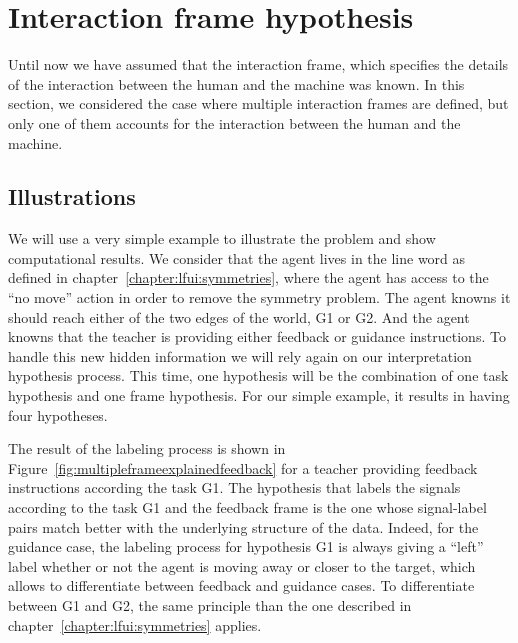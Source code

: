 
\section{Interaction frame hypothesis}
\label{chapter:limitations:framehypothesis}


Until now we have assumed that the interaction frame, which specifies the details of the interaction between the human and the machine was known. In this section, we considered the case where multiple interaction frames are defined, but only one of them accounts for the interaction between the human and the machine.


\subsection{Illustrations}

We will use a very simple example to illustrate the problem and show computational results. We consider that the agent lives in the line word as defined in chapter~\ref{chapter:lfui:symmetries}, where the agent has access to the ``no move'' action in order to remove the symmetry problem. The agent knowns it should reach either of the two edges of the world, G1 or G2. And the agent knowns that the teacher is providing either feedback or guidance instructions. To handle this new hidden information we will rely again on our interpretation hypothesis process. This time, one hypothesis will be the combination of one task hypothesis and one frame hypothesis. For our simple example, it results in having four hypotheses.

The result of the labeling process is shown in Figure~\ref{fig:multipleframeexplainedfeedback} for a teacher providing feedback instructions according the task G1. The hypothesis that labels the signals according to the task G1 and the feedback frame is the one whose signal-label pairs match better with the underlying structure of the data. Indeed, for the guidance case, the labeling process for hypothesis G1 is always giving a ``left'' label whether or not the agent is moving away or closer to the target, which allows to differentiate between feedback and guidance cases. To differentiate between G1 and G2, the same principle than the one described in chapter~\ref{chapter:lfui:symmetries} applies.

